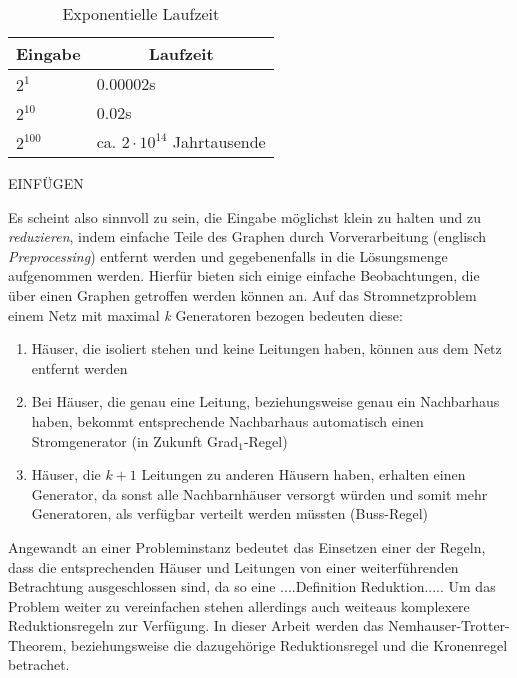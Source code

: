  \begin{table}[htb]
\caption{Exponentielle Laufzeit \label{tab:exponential}}
\vspace*{1em}
\centering

\bgroup
\def\arraystretch{1.3}%

\begin{threeparttable}

\begin{tabular}[c]{ l | l }
	
	\multicolumn{1}{c|}{\textbf{Eingabe}} & 
	\multicolumn{1}{c}{\textbf{Laufzeit}} \\ 
	
	\hline

	$2^{1}$& 0.00002s\\
	$2^{10}$& 0.02s\\
	$2^{100}$& ca. $ 2 \cdot 10^{14} $ Jahrtausende \\
	
\end{tabular}

\begin{tablenotes}\footnotesize
\item EINFÜGEN
\end{tablenotes}

\end{threeparttable}

\egroup

\end{table}
Es scheint also sinnvoll zu sein, die Eingabe möglichst klein zu halten und zu \emph{reduzieren}, indem einfache Teile des Graphen durch Vorverarbeitung (englisch \emph{Preprocessing}) entfernt werden und gegebenenfalls in die Lösungsmenge aufgenommen werden. Hierfür bieten sich einige einfache Beobachtungen, die über einen Graphen getroffen werden können an. Auf das Stromnetzproblem einem Netz mit maximal \emph{k} Generatoren bezogen bedeuten diese: 
\begin{enumerate}
\item Häuser, die isoliert stehen und keine Leitungen haben, können aus dem Netz entfernt werden
\item Bei Häuser, die genau eine Leitung, beziehungsweise genau ein Nachbarhaus haben, bekommt entsprechende Nachbarhaus automatisch einen Stromgenerator (in Zukunft Grad$_{1}$-Regel)
\item Häuser, die $k+1$ Leitungen zu anderen Häusern haben, erhalten einen Generator, da sonst alle Nachbarnhäuser versorgt würden und somit mehr Generatoren, als verfügbar verteilt werden müssten (Buss-Regel)
\end{enumerate}
Angewandt an einer Probleminstanz bedeutet das Einsetzen einer der Regeln, dass die entsprechenden Häuser und Leitungen von einer weiterführenden Betrachtung ausgeschlossen sind, da so eine
....Definition Reduktion.....
Um das Problem weiter zu vereinfachen stehen allerdings auch weiteaus komplexere Reduktionsregeln zur Verfügung. In dieser Arbeit werden das Nemhauser-Trotter-Theorem, beziehungsweise die dazugehörige Reduktionsregel und die Kronenregel betrachet.


